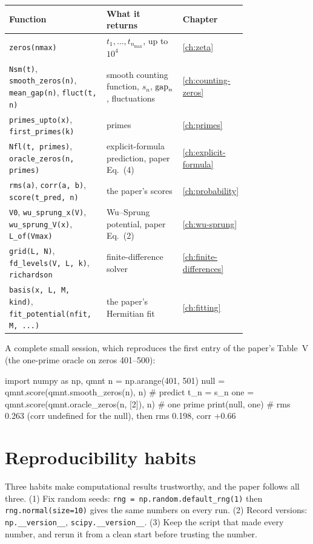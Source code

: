 \begin{center}\small
\begin{tabular}{p{0.42\linewidth}p{0.36\linewidth}l}
\toprule
Function & What it returns & Chapter\\
\midrule
\texttt{zeros(nmax)} & $t_1,\dots,t_{n_{\max}}$, up to $10^4$ & \ref{ch:zeta}\\
\texttt{Nsm(t)}, \texttt{smooth\_zeros(n)}, \texttt{mean\_gap(n)}, \texttt{fluct(t, n)} & smooth counting function, $s_n$, $\mathrm{gap}_n$, fluctuations & \ref{ch:counting-zeros}\\
\texttt{primes\_upto(x)}, \texttt{first\_primes(k)} & primes & \ref{ch:primes}\\
\texttt{Nfl(t, primes)}, \texttt{oracle\_zeros(n, primes)} & explicit-formula prediction, paper Eq.~(4) & \ref{ch:explicit-formula}\\
\texttt{rms(a)}, \texttt{corr(a, b)}, \texttt{score(t\_pred, n)} & the paper's scores & \ref{ch:probability}\\
\texttt{V0}, \texttt{wu\_sprung\_x(V)}, \texttt{wu\_sprung\_V(x)}, \texttt{L\_of(Vmax)} & Wu--Sprung potential, paper Eq.~(2) & \ref{ch:wu-sprung}\\
\texttt{grid(L, N)}, \texttt{fd\_levels(V, L, k)}, \texttt{richardson} & finite-difference solver & \ref{ch:finite-differences}\\
\texttt{basis(x, L, M, kind)}, \texttt{fit\_potential(nfit, M, ...)} & the paper's Hermitian fit & \ref{ch:fitting}\\
\bottomrule
\end{tabular}
\end{center}

A complete small session, which reproduces the first entry of the paper's Table~V (the one-prime oracle on zeros 401--500):
\begin{pycode}
import numpy as np, qmnt
n = np.arange(401, 501)
null = qmnt.score(qmnt.smooth_zeros(n), n)       # predict t_n = s_n
one = qmnt.score(qmnt.oracle_zeros(n, [2]), n)   # one prime
print(null, one)    # rms 0.263 (corr undefined for the null), then rms 0.198, corr +0.66
\end{pycode}

\section{Reproducibility habits}

Three habits make computational results trustworthy, and the paper follows all three. (1) Fix random seeds: \texttt{rng = np.random.default\_rng(1)} then \texttt{rng.normal(size=10)} gives the same numbers on every run. (2) Record versions: \texttt{np.\_\_version\_\_}, \texttt{scipy.\_\_version\_\_}. (3) Keep the script that made every number, and rerun it from a clean start before trusting the number.

